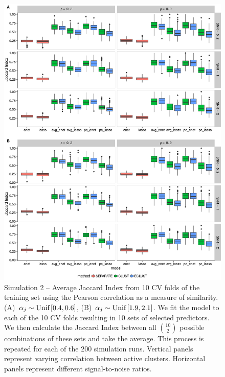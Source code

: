 \begin{appendices}
\begin{figure}[H]
	\centering
	\includegraphics[scale=0.55, keepaspectratio]{./figs/hydra/results/figures/sim2-sept8/jacc_Correlation_sim2.png}
	\caption{Simulation 2 -- Average Jaccard Index from 10 CV folds of the training set using the Pearson correlation as a measure of similarity. \mbox{(A) $\alpha_{j} \sim \textrm{{Unif}}\left[0.4, 0.6\right]$}, \mbox{(B) $\alpha_{j} \sim \textrm{{Unif}}\left[1.9, 2.1\right]$}. We fit the model to each of the 10 CV folds resulting in 10 sets of selected predictors. We then calculate the Jaccard Index between all $\binom{10}{2}$ possible combinations of these sets and take the average. This process is repeated for each of the 200 simulation runs. Vertical panels represent varying correlation between active clusters. Horizontal panels represent different signal-to-noise ratios.}
	\label{fig:jacc_Correlation_sim2}
\end{figure}



\end{appendices}

